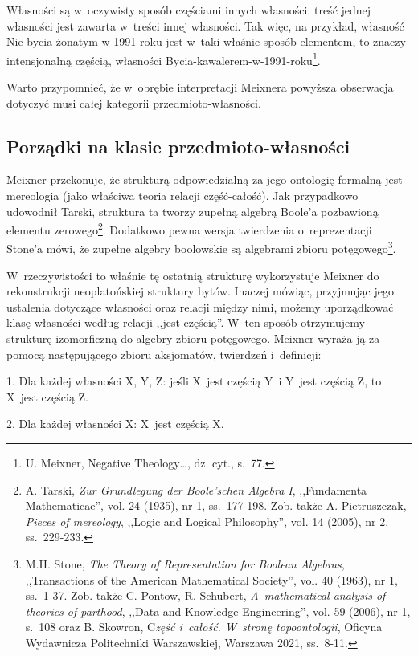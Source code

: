 Własności są w~oczywisty sposób częściami innych własności: treść jednej własności jest zawarta w~treści innej własności. Tak więc, na przykład, własność Nie-bycia-żonatym-w-1991-roku jest w~taki właśnie sposób elementem, to znaczy intensjonalną częścią, własności Bycia-kawalerem-w-1991-roku\footnote{U. Meixner, Negative Theology…, dz. cyt., s.~77.}.

Warto przypomnieć, że w~obrębie interpretacji Meixnera powyższa obserwacja dotyczyć musi całej kategorii przedmioto-własności.

\subsection{Porządki na klasie przedmioto-własności}

Meixner przekonuje, że strukturą odpowiedzialną za jego ontologię formalną jest mereologia (jako właściwa teoria relacji część-całość). Jak przypadkowo udowodnił Tarski, struktura ta tworzy zupełną algebrą Boole'a pozbawioną elementu zerowego\footnote{A. Tarski, \textit{Zur Grundlegung der Boole'schen Algebra I}, ,,Fundamenta Mathematicae'', vol. 24 (1935), nr 1, ss.~177-198. Zob. także A. Pietruszczak, \textit{Pieces of mereology}, ,,Logic and Logical Philosophy'', vol. 14 (2005), nr 2, ss.~229-233.}. Dodatkowo pewna wersja twierdzenia o~reprezentacji Stone'a mówi, że zupełne algebry boolowskie są algebrami zbioru potęgowego\footnote{M.H. Stone, \textit{The Theory of Representation for Boolean Algebras}, ,,Transactions of the American Mathematical Society'', vol. 40 (1963), nr 1, ss.~1-37. Zob. także C. Pontow, R. Schubert, \textit{A~mathematical analysis of theories of parthood}, ,,Data and Knowledge Engineering'', vol. 59 (2006), nr 1, s.~108 oraz B. Skowron, C\textit{zęść i~całość. W~stronę topoontologii}, Oficyna Wydawnicza Politechniki Warszawskiej, Warszawa 2021, ss.~8-11.}.

W~rzeczywistości to właśnie tę ostatnią strukturę wykorzystuje Meixner do rekonstrukcji neoplatońskiej struktury bytów. Inaczej mówiąc, przyjmując jego ustalenia dotyczące własności oraz relacji między nimi, możemy uporządkować klasę własności według relacji ,,jest częścią''. W~ten sposób otrzymujemy strukturę izomorficzną do algebry zbioru potęgowego. Meixner wyraża ją za pomocą następującego zbioru aksjomatów, twierdzeń i~definicji:

1. Dla każdej własności X, Y, Z: jeśli X~jest częścią Y~i Y~jest częścią Z, to X~jest częścią Z.

2. Dla każdej własności X: X~jest częścią X.

